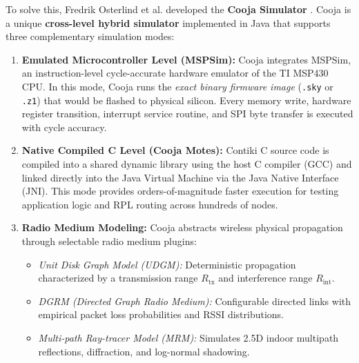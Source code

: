 To solve this, Fredrik Osterlind et al. developed the \textbf{Cooja Simulator} \cite{osterlind2006cross}. Cooja is a unique \textbf{cross-level hybrid simulator} implemented in Java that supports three complementary simulation modes:
\begin{enumerate}
    \item \textbf{Emulated Microcontroller Level (MSPSim):} Cooja integrates MSPSim, an instruction-level cycle-accurate hardware emulator of the TI MSP430 CPU. In this mode, Cooja runs the \textit{exact binary firmware image} (\texttt{.sky} or \texttt{.z1}) that would be flashed to physical silicon. Every memory write, hardware register transition, interrupt service routine, and SPI byte transfer is executed with cycle accuracy.
    \item \textbf{Native Compiled C Level (Cooja Motes):} Contiki C source code is compiled into a shared dynamic library using the host C compiler (GCC) and linked directly into the Java Virtual Machine via the Java Native Interface (JNI). This mode provides orders-of-magnitude faster execution for testing application logic and RPL routing across hundreds of nodes.
    \item \textbf{Radio Medium Modeling:} Cooja abstracts wireless physical propagation through selectable radio medium plugins:
    \begin{itemize}
        \item \textit{Unit Disk Graph Model (UDGM):} Deterministic propagation characterized by a transmission range $R_{\text{tx}}$ and interference range $R_{\text{int}}$.
        \item \textit{DGRM (Directed Graph Radio Medium):} Configurable directed links with empirical packet loss probabilities and RSSI distributions.
        \item \textit{Multi-path Ray-tracer Model (MRM):} Simulates 2.5D indoor multipath reflections, diffraction, and log-normal shadowing.
    \end{itemize}
\end{enumerate}

